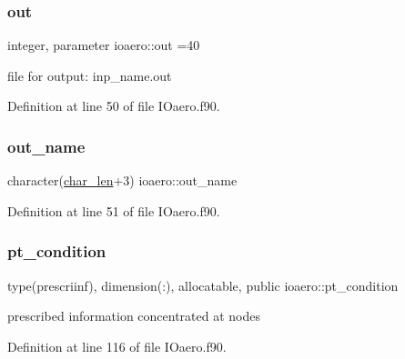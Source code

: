 \mbox{\label{namespaceioaero_a7c01d4bcd841d8d6281f29d5fc818fd8}} 
\subsubsection{\texorpdfstring{out}{out}}
{\footnotesize\ttfamily integer, parameter ioaero\+::out =40\hspace{0.3cm}{\ttfamily [private]}}



file for output\+: inp\+\_\+name.\+out 



Definition at line 50 of file I\+Oaero.\+f90.

\mbox{\label{namespaceioaero_a6693b9440660a84d2d2fc41ac183bb0f}} 
\subsubsection{\texorpdfstring{out\+\_\+name}{out\_name}}
{\footnotesize\ttfamily character(\hyperlink{namespaceioaero_acd6bdfdcfd986fd1c26261e5996e3b03}{char\+\_\+len}+3) ioaero\+::out\+\_\+name\hspace{0.3cm}{\ttfamily [private]}}



Definition at line 51 of file I\+Oaero.\+f90.

\mbox{\label{namespaceioaero_a4344b2018135ae7fe0a09f4265fd2c29}} 
\subsubsection{\texorpdfstring{pt\+\_\+condition}{pt\_condition}}
{\footnotesize\ttfamily type(prescriinf), dimension(\+:), allocatable, public ioaero\+::pt\+\_\+condition}



prescribed information concentrated at nodes 



Definition at line 116 of file I\+Oaero.\+f90.

\mbox{\label{namespaceioaero_ab6c271c9ebbeb9a315ec53d38facb60b}} 
